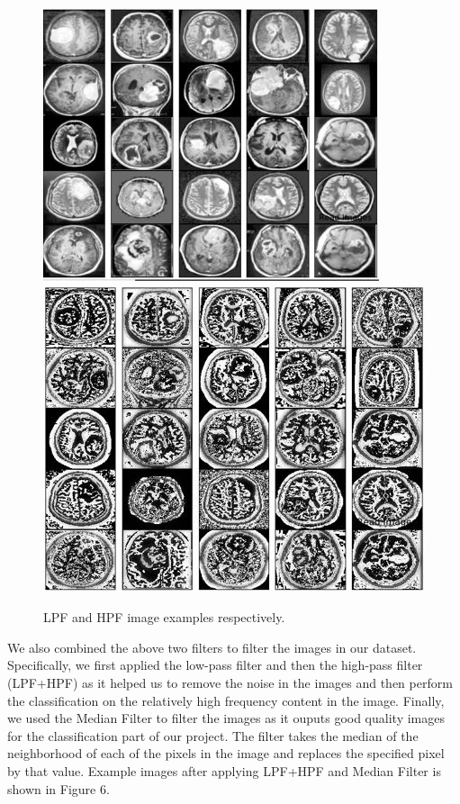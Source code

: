 \documentclass[conference]{IEEEtran}
\begin{document}
\begin{figure}[h]
\centering
\includegraphics[scale=0.43]{figures/lpf.JPG}
\includegraphics[scale=0.39]{figures/hpf.JPG}
\caption{LPF and HPF image examples respectively.}
\end{figure} 

We also combined the above two filters to filter the images in our dataset. Specifically, we first applied the low-pass filter and then the high-pass filter (LPF+HPF) as it helped us to remove the noise in the images and then perform the classification on the relatively high frequency content in the image. Finally, we used the Median Filter to filter the images as it ouputs good quality images for the classification part of our project. The filter takes the median of the neighborhood of each of the pixels in the image and replaces the specified pixel by that value. Example images after applying LPF+HPF and Median Filter is shown in Figure 6.
\end{document}
